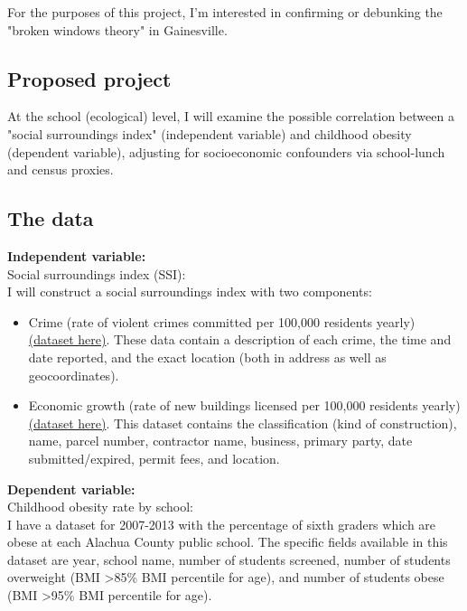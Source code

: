 \documentclass[11pt]{article}
\begin{document}
\begin{multicols}{2}
For the purposes of this project, I'm interested in confirming or debunking the "broken windows theory" in Gainesville.  


\subsection*{Proposed project}
At the school (ecological) level, I will examine the possible correlation between a "social surroundings index" (independent variable) and childhood obesity (dependent variable), adjusting for socioeconomic confounders via school-lunch and census proxies.  \\

\subsection*{The data}

\noindent \textbf{Independent variable:} \\
Social surroundings index (SSI):\\
I will construct a social surroundings index with two components:
\begin{itemize}
\item Crime (rate of violent crimes committed per 100,000 residents yearly) \href{https://data.cityofgainesville.org/Public-Safety/Crime-Incident-Data-2013/9ccb-cyth}{(dataset here)}. These data contain a description of each crime, the time and date reported, and the exact location (both in address as well as geocoordinates).
\item Economic growth (rate of new buildings licensed per 100,000 residents yearly) \href{https://data.cityofgainesville.org/browse?category=Economic+Development+\%26+Redevelopment&limitTo=datasets&utf8=\%E2\%9C\%93}{(dataset here)}.  This dataset contains the classification (kind of construction), name, parcel number, contractor name, business, primary party, date submitted/expired, permit fees, and location.  
\end{itemize}


\noindent \textbf{Dependent variable:} \\
Childhood obesity rate by school:\\
I have a dataset for 2007-2013 with the percentage of sixth graders which are obese at each Alachua County public school.  The specific fields available in this dataset are year, school name, number of students screened, number of students overweight (BMI >85\% BMI percentile for age), and number of students obese (BMI >95\% BMI percentile for age). \\


\end{multicols}
\end{document}
